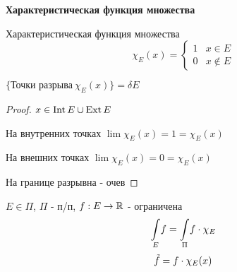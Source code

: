 
\setcounter{lemma}{9}





    {\noindent\large\textbf{Характеристическая функция множества}} \hfill {}

    \begin{definition}
        Характеристическая функция множества 
        \begin{equation*}
            \chi_{E}(x) = 
             \begin{cases}
               1 & x \in E \\
               0 & x \not \in E
             \end{cases}
            \end{equation*}
    \end{definition}


    \begin{lemma}
        $\{\text{Точки разрыва} \ \chi_{E}(x)\} = \delta E$ 
    \end{lemma}

    \begin{proof}
       \par $x \in \operatorname{Int} E \cup \operatorname{Ext} E $
       \par На внутренних точках $\lim \chi_{E}(x) = 1 = \chi_{E}(x)$
       \par На внешних точках $\lim \chi_{E}(x) = 0 = \chi_{E}(x)$
       \bigskip
       \par На границе разрывна - очев

    \end{proof}

    \begin{definition}
        \par $E \in \Pi$, $\Pi$ - п/п, $f: E \rightarrow \mathbb{R}$ - ограничена
        \bigskip
        $$\underset{E}{\int} f = \underset{\Pi}{\int} f\cdot \chi_{E}$$
        \bigskip
        $$\tilde f = f \cdot \chi_{E}(x)$$

    \end{definition}

